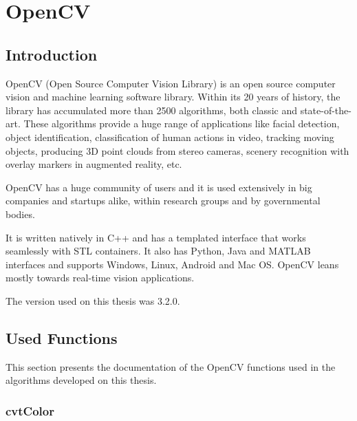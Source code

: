 \chapter{OpenCV}
\label{app:opencv_functions}

\section{Introduction}
\label{sec:opencv_appendix_introduction}

OpenCV (Open Source Computer Vision Library) is an open source computer vision and machine learning software library. Within its 20 years of history, the library has accumulated more than 2500 algorithms, both classic and state-of-the-art. These algorithms provide a huge range of applications like facial detection, object identification, classification of human actions in video, tracking moving objects, producing 3D point clouds from stereo cameras, scenery recognition with overlay markers in augmented reality, etc.

OpenCV has a huge community of users and it is used extensively in big companies and startups alike, within research groups and by governmental bodies.

It is written natively in C++ and has a templated interface that works seamlessly with STL containers. It also has Python, Java and MATLAB interfaces and supports Windows, Linux, Android and Mac OS. OpenCV leans mostly towards real-time vision applications.

The version used on this thesis was 3.2.0.


\section{Used Functions}
\label{sec:opencv_appendix_used_functions}

This section presents the documentation of the OpenCV functions used in the algorithms developed on this thesis.

\subsection*{cvtColor}
\label{subsec:opencv_appendix_used_functions_cvtcolor}

